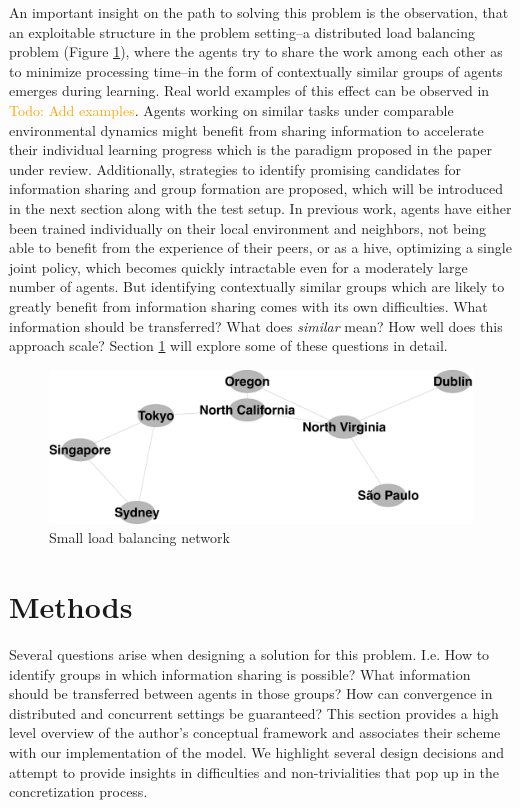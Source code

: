 \documentclass[letterpaper]{article}
\newcommand\todo[1]{\textcolor{orange}{Todo: #1}}
\begin{document}
An important insight on the path to solving this problem is the observation, that an exploitable structure in the problem setting--a distributed load balancing problem (Figure \ref{fig:loadbalancing}), where the agents try to share the work among each other as to minimize processing time--in the form of contextually similar groups of agents emerges during learning. Real world examples of this effect can be observed in \todo{Add examples}. Agents working on similar tasks under comparable environmental dynamics might benefit from sharing information to accelerate their individual learning progress which is the paradigm proposed in the paper under review. Additionally, strategies to identify promising candidates for information sharing and group formation are proposed, which will be introduced in the next section along with the test setup. In previous work, agents have either been trained individually on their local environment and neighbors, not being able to benefit from the experience of their peers, or as a hive, optimizing a single joint policy, which becomes quickly intractable even for a moderately large number of agents. But identifying contextually similar groups which are likely to greatly benefit from information sharing comes with its own difficulties. What information should be transferred? What does \textit{similar} mean? How well does this approach scale? Section \ref{sec:methods} will explore some of these questions in detail.
\begin{figure}[ht]
 \begin{center}
  \includegraphics[width=\linewidth]{figures/loadbalancing}
  \caption{Small load balancing network \citep{garant2015accelerating}}
  \label{fig:loadbalancing}
 \end{center}
\end{figure}

\section{Methods} \label{sec:methods}
Several questions arise when designing a solution for this problem. I.e. How to identify groups in which information sharing is possible? What information should be transferred between agents in those groups? How can convergence in distributed and concurrent settings be guaranteed? This section provides a high level overview of the author’s conceptual framework and associates their scheme with our implementation of the model.  We highlight several design decisions and attempt to provide insights in difficulties and non-trivialities that pop up in the concretization process.
\end{document}
